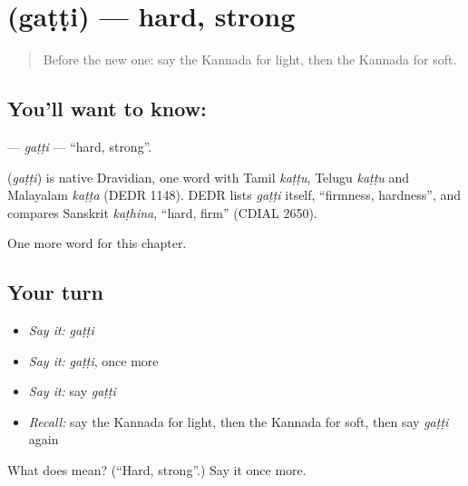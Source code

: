 \section[\texorpdfstring{\kn{ಗಟ್ಟಿ} (gaṭṭi)}{ಗಟ್ಟಿ (gaṭṭi)}]{ (gaṭṭi) — hard, strong}

\label{lesson:KA-C141-gatti}



\begin{quote}
Before the new one: say the Kannada for light, then the Kannada for soft.
\end{quote}

\subsection*{You'll want to know: }
\textbf{} — \emph{gaṭṭi} — \textquotedblleft{}hard, strong\textquotedblright{}.

\begin{cousinweb}
\textbf{} (\emph{gaṭṭi}) is native Dravidian, one word with Tamil \emph{kaṭṭu}, Telugu \emph{kaṭṭu} and Malayalam \emph{kaṭṭa} (DEDR 1148). DEDR lists \emph{gaṭṭi} itself, \textquotedblleft{}firmness, hardness\textquotedblright{}, and compares Sanskrit \emph{kaṭhina}, \textquotedblleft{}hard, firm\textquotedblright{} (CDIAL 2650).
\end{cousinweb}

\begin{grammarlens}[title={What you've built}]
One more word for this chapter.
\end{grammarlens}

\subsection*{Your turn}
\begin{itemize}
\raggedright
  \item \emph{Say it:} \emph{gaṭṭi}
  \item \emph{Say it:} \emph{gaṭṭi}, once more
  \item \emph{Say it:} say \emph{gaṭṭi}
  \item \emph{Recall:} say the Kannada for light, then the Kannada for soft, then say \emph{gaṭṭi} again
\end{itemize}

\begin{tcolorbox}[breakable,colback=teal!4,colframe=teal!35!black,title={Before you move on}]
What does  mean? (\textquotedblleft{}Hard, strong\textquotedblright{}.) Say it once more.
\end{tcolorbox}
